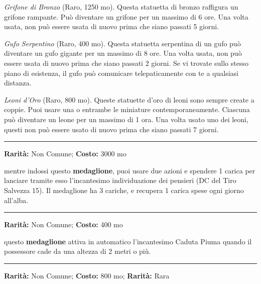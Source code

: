 \begin{multicols}{2}
\emph{Grifone di Bronzo} (Raro, 1250 mo). Questa statuetta di bronzo raffigura un grifone rampante. Può diventare un grifone per un massimo di 6 ore. Una volta usata, non può essere usata di nuovo prima che siano passati 5 giorni.

\emph{Gufo Serpentino} (Raro, 400 mo). Questa statuetta serpentina di un gufo può diventare un gufo gigante per un massimo di 8 ore. Una volta usata, non può essere usata di nuovo prima che siano passati 2 giorni. Se vi trovate sullo stesso piano di esistenza, il gufo può comunicare telepaticamente con te a qualsiasi distanza.

\emph{Leoni d'Oro} (Raro, 800 mo). Queste statuette d'oro di leoni sono sempre create a coppie. Puoi usare una o entrambe le miniature contemporaneamente. Ciascuna può diventare un leone per un massimo di 1 ora. Una volta usato uno dei leoni, questi non può essere usato di nuovo prima che siano passati 7 giorni.

\smallskip\noindent\rule{\linewidth}{2pt}  \hypertarget{MedaglionedeiPensieri}{}\medskip{}\noindent\label{MedaglionedeiPensieri}

\textbf{Rarità:} Non Comune; \textbf{Costo:} 3000 mo

mentre indossi questo \textbf{medaglione}, puoi usare due azioni e spendere 1 carica per lanciare tramite esso l'incantesimo individuazione dei pensieri (DC del Tiro Salvezza 15). Il medaglione ha 3 cariche, e recupera 1 carica spese ogni giorno all'alba.

\smallskip\noindent\rule{\linewidth}{2pt}  \hypertarget{MedaglionedellaCadutapiuma}{}\medskip{}\noindent\label{MedaglionedellaCadutapiuma}

\textbf{Rarità:} Non Comune; \textbf{Costo:} 400 mo

questo \textbf{medaglione} attiva in automatico l'incantesimo Caduta Piuma quando il possessore cade da una altezza di 2 metri o più.

\smallskip\noindent\rule{\linewidth}{2pt}  \hypertarget{Mithral}{}\medskip{}\noindent\label{Mithral}

\textbf{Rarità:} Non Comune; \textbf{Costo:} 800 mo; \textbf{Rarità:} Rara


\end{multicols}
